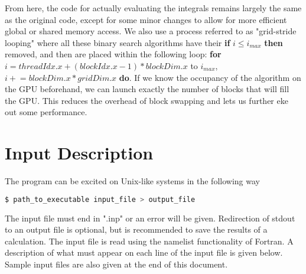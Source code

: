 \documentclass[12pt]{book}
\begin{document}
From here, the code for actually evaluating the integrals remains largely the same as the original code, except for some minor changes to allow for more efficient global or shared memory access. We also use a process referred to as "grid-stride looping" where all these binary search algorithms have their \textbf{if} $i \le i_{max}$ \textbf{then} removed, and then are placed within the following loop: \textbf{for} $i = threadIdx.x + (blockIdx.x - 1) * blockDim.x$ to $i_{max}$, $i \mathrel{+}= blockDim.x * gridDim.x$ \textbf{do}. If we know the occupancy of the algorithm on the GPU beforehand, we can launch exactly the number of blocks that will fill the GPU. This reduces the overhead of block swapping and lets us further eke out some performance.	


\section{Input Description}\label{inp_des}
The program can be excited on Unix-like systems in the following way
\begin{lstlisting}[language=bash]
	$ path_to_executable input_file > output_file
\end{lstlisting}

The input file must end in ".inp" or an error will be given. Redirection of stdout to an output file is optional, but is recommended to save the results of a calculation. The input file is read using the namelist functionality of Fortran. A description of what must appear on each line of the input file is given below. Sample input files are also given at the end of this document.
\end{document}
